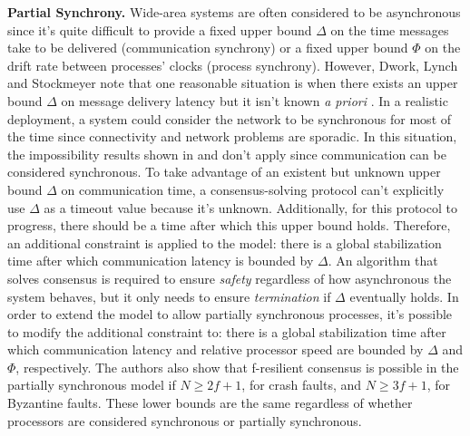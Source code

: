 \textbf{Partial Synchrony.} Wide-area systems are often considered to be asynchronous since it's quite difficult to provide a fixed upper bound $\Delta$ on the time messages take to be delivered (communication synchrony) or a fixed upper bound $\Phi$ on the drift rate between processes' clocks (process synchrony). However, Dwork, Lynch and Stockmeyer note that one reasonable situation is when there exists an upper bound $\Delta$ on message delivery latency but it isn't known \textit{a priori} \cite{Dwork1988}. In a realistic deployment, a system could consider the network to be synchronous for most of the time since connectivity and network problems are sporadic. In this situation, the impossibility results shown in \cite{Fischer1985} and \cite{Dolev1983} don't apply since communication can be considered synchronous. To take advantage of an existent but unknown upper bound $\Delta$ on communication time, a consensus-solving protocol can't explicitly use $\Delta$ as a timeout value because it's unknown. Additionally, for this protocol to progress, there should be a time after which this upper bound holds. Therefore, an additional constraint is applied to the model: there is a global stabilization time after which communication latency is bounded by $\Delta$. An algorithm that solves consensus is required to ensure \textit{safety} regardless of how asynchronous the system behaves, but it only needs to ensure \textit{termination} if $\Delta$ eventually holds. In order to extend the model to allow partially synchronous processes, it's possible to modify the additional constraint to: there is a global stabilization time after which communication latency and relative processor speed are bounded by $\Delta$ and $\Phi$, respectively. The authors also show that f-resilient consensus is possible in the partially synchronous model if $N \geq 2f+1$, for crash faults, and $N \geq 3f+1$, for Byzantine faults. These lower bounds are the same regardless of whether processors are considered synchronous or partially synchronous.\par
